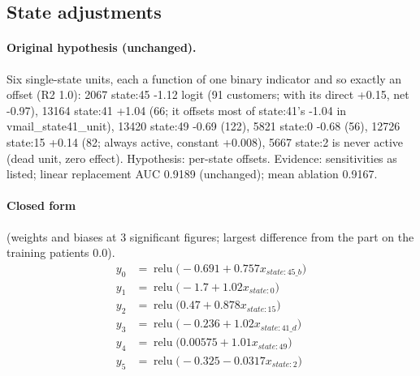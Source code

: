 \documentclass[a4paper,10pt]{article}
\newif\ifreviewmarks
\newcommand{\reviewrule}{\noindent{\color{BrickRed}\rule{\linewidth}{0.8pt}}}
\newenvironment{drafted}[1][]{%
  \ifreviewmarks\par\addvspace{\medskipamount}\reviewrule\par\nopagebreak
  \noindent{\color{BrickRed}\sffamily\footnotesize\textbf{Thesis Draft}\quad #1\hfill review}\par\nopagebreak\smallskip\fi}{%
  \ifreviewmarks\par\smallskip\noindent{\color{BrickRed}\sffamily\footnotesize end of thesis draft}\par\nopagebreak\reviewrule\par\medskip\fi}
\begin{document}
\begin{drafted}[plain-language layer: churn100-s7-c1]
\subsection{State adjustments}\label{tech:ann82}
\paragraph{Original hypothesis (unchanged).} Six single-state units, each a function of one binary indicator and so exactly an offset (R2 1.0): 2067 state:45 -1.12 logit (91 customers; with its direct +0.15, net -0.97), 13164 state:41 +1.04 (66; it offsets most of state:41's -1.04 in vmail\_\allowbreak{}state41\_\allowbreak{}unit), 13420 state:49 -0.69 (122), 5821 state:0 -0.68 (56), 12726 state:15 +0.14 (82; always active, constant +0.008), 5667 state:2 is never active (dead unit, zero effect). Hypothesis: per-state offsets. Evidence: sensitivities as listed; linear replacement AUC 0.9189 (unchanged); mean ablation 0.9167.
\paragraph{Closed form} {\footnotesize(weights and biases at 3 significant figures; largest difference from the part on the training patients 0.0).}
{\small\begingroup\allowdisplaybreaks
\begin{align*}
y_{0} &= \operatorname{relu}\bigl(-0.691 + 0.757 x_{state:45\_b}\bigr) \\
y_{1} &= \operatorname{relu}\bigl(-1.7 + 1.02 x_{state:0}\bigr) \\
y_{2} &= \operatorname{relu}\bigl(0.47 + 0.878 x_{state:15}\bigr) \\
y_{3} &= \operatorname{relu}\bigl(-0.236 + 1.02 x_{state:41\_d}\bigr) \\
y_{4} &= \operatorname{relu}\bigl(0.00575 + 1.01 x_{state:49}\bigr) \\
y_{5} &= \operatorname{relu}\bigl(-0.325 - 0.0317 x_{state:2}\bigr)
\end{align*}\endgroup}


\end{drafted}
\end{document}
